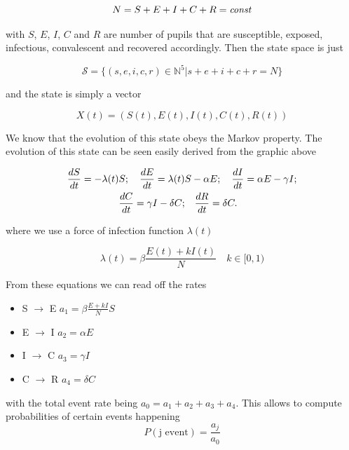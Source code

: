 \begin{equation}
    N = S + E + I + C + R = {\rm \textit{const}}
\end{equation}

with $S$, $E$, $I$, $C$ and $R$ are number of pupils that are susceptible, exposed, infectious, convalescent and recovered accordingly. Then the state space is just

\begin{equation*}
    \mathcal{S} = \{ (s,e,i,c,r) \in \mathbb{N}^5 | s+e+i+c+r = N \}
\end{equation*}

and the state is simply a vector

\begin{equation*}
    X(t) = (S(t), E(t), I(t), C(t), R(t))
\end{equation*}

We know that the evolution of this state obeys the Markov property. The evolution of this state can be seen easily derived from the graphic above

\begin{align}
    \frac{dS}{dt} = - \lambda(t) S; \quad \frac{dE}{dt} = \lambda(t) &S - \alpha E; \quad \frac{dI}{dt} = \alpha E - \gamma I; \notag \\
    \frac{dC}{dt} = \gamma I - \delta C; &\quad \frac{dR}{dt} = \delta C. \label{eq:differential}
\end{align}

where we use a force of infection function $\lambda(t)$

\begin{equation*}
    \lambda (t) = \beta \frac{E(t) + k I(t)}{N} \quad k \in [ 0 , 1 )
\end{equation*}

From these equations we can read off the rates
\begin{itemize}\label{event rates}
    \item S $\rightarrow$ E \quad $a_1 = \beta \frac{E + kI}{N} S$
    \item E $\rightarrow$ I \quad $a_2 = \alpha E$
    \item I $\rightarrow$ C \quad $a_3 = \gamma I$
    \item C $\rightarrow$ R \quad $a_4 = \delta C$
\end{itemize}

with the total event rate being $a_0 = a_1 + a_2 + a_3 + a_4$. This allows to compute probabilities of certain events happening
\begin{equation}\label{event probabilities}
  P (\text{j event}) = \frac{a_j}{a_0}
\end{equation}

